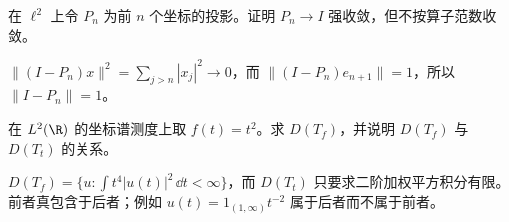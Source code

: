 \begin{exercise}[强收敛与范数收敛]\label{ex:y11-projection-limits}
在 $\ell^2$ 上令 $P_n$ 为前 $n$ 个坐标的投影。证明 $P_n\to I$ 强收敛，但不按算子范数收敛。
\end{exercise}
\begin{solution}
$\|(I-P_n)x\|^2=\sum_{j>n}|x_j|^2\to0$，而 $\|(I-P_n)e_{n+1}\|=1$，所以 $\|I-P_n\|=1$。
\end{solution}

\begin{exercise}[无界积分]\label{ex:y11-integral-domain}
在 $L^2(\R)$ 的坐标谱测度上取 $f(t)=t^2$。求 $D(T_f)$，并说明 $D(T_f)$ 与 $D(T_t)$ 的关系。
\end{exercise}
\begin{solution}
$D(T_f)=\{u:\int t^4|u(t)|^2\,\dd t<\infty\}$，而 $D(T_t)$ 只要求二阶加权平方积分有限。前者真包含于后者；例如 $u(t)=1_{(1,\infty)}t^{-2}$ 属于后者而不属于前者。
\end{solution}

